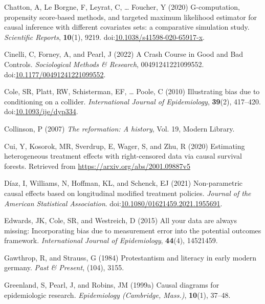 \documentclass[
  singlecolumn,
  9pt]{article}
\begin{document}
\begin{CSLReferences}
Chatton, A, Le Borgne, F, Leyrat, C, \ldots{} Foucher, Y (2020)
G-computation, propensity score-based methods, and targeted maximum
likelihood estimator for causal inference with different covariates
sets: a comparative simulation study. \emph{Scientific Reports},
\textbf{10}(1), 9219.
doi:\href{https://doi.org/10.1038/s41598-020-65917-x}{10.1038/s41598-020-65917-x}.

Cinelli, C, Forney, A, and Pearl, J (2022) A Crash Course in Good and
Bad Controls. \emph{Sociological Methods \& Research},
00491241221099552.
doi:\href{https://doi.org/10.1177/00491241221099552}{10.1177/00491241221099552}.

Cole, SR, Platt, RW, Schisterman, EF, \ldots{} Poole, C (2010)
Illustrating bias due to conditioning on a collider. \emph{International
Journal of Epidemiology}, \textbf{39}(2), 417--420.
doi:\href{https://doi.org/10.1093/ije/dyp334}{10.1093/ije/dyp334}.

Collinson, P (2007) \emph{The reformation: A history}, Vol. 19, Modern
Library.

Cui, Y, Kosorok, MR, Sverdrup, E, Wager, S, and Zhu, R (2020) Estimating
heterogeneous treatment effects with right-censored data via causal
survival forests. Retrieved from
\url{https://arxiv.org/abs/2001.09887v5}

Díaz, I, Williams, N, Hoffman, KL, and Schenck, EJ (2021) Non-parametric
causal effects based on longitudinal modified treatment policies.
\emph{Journal of the American Statistical Association}.
doi:\href{https://doi.org/10.1080/01621459.2021.1955691}{10.1080/01621459.2021.1955691}.

Edwards, JK, Cole, SR, and Westreich, D (2015) All your data are always
missing: Incorporating bias due to measurement error into the potential
outcomes framework. \emph{International Journal of Epidemiology},
\textbf{44}(4), 14521459.

Gawthrop, R, and Strauss, G (1984) Protestantism and literacy in early
modern germany. \emph{Past \& Present}, (104), 3155.

Greenland, S, Pearl, J, and Robins, JM (1999a) Causal diagrams for
epidemiologic research. \emph{Epidemiology (Cambridge, Mass.)},
\textbf{10}(1), 37--48.


\end{CSLReferences}
\end{document}
